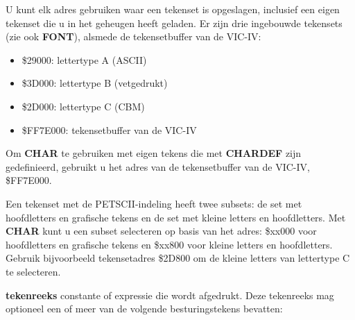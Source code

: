 \begin{description}[leftmargin=2cm,style=nextline]
                 U kunt elk adres gebruiken waar een tekenset is opgeslagen, inclusief een eigen tekenset die u in het geheugen heeft geladen. Er zijn drie ingebouwde tekensets (zie ook {\bf FONT}), alsmede de tekensetbuffer van de VIC-IV:
                 \begin{itemize}
                    \item \$29000: lettertype A (ASCII)                    \item \$3D000: lettertype B (vetgedrukt)                    \item \$2D000: lettertype C (CBM)                    \item \$FF7E000: tekensetbuffer van de VIC-IV
                 \end{itemize}

                 Om {\bf CHAR} te gebruiken met eigen tekens die met {\bf CHARDEF} zijn gedefinieerd, gebruikt u het adres van de tekensetbuffer van de VIC-IV, \$FF7E000.

                 Een tekenset met de PETSCII-indeling heeft twee subsets: de set met hoofdletters en grafische tekens en de set met kleine letters en hoofdletters. Met {\bf CHAR} kunt u een subset selecteren op basis van het adres: \$xx000 voor hoofdletters en grafische tekens en \$xx800 voor kleine letters en hoofdletters. Gebruik bijvoorbeeld tekensetadres \$2D800 om de kleine letters van lettertype C te selecteren.

                 {\bf tekenreeks} constante of expressie die wordt afgedrukt. Deze tekenreeks mag optioneel een of meer van de volgende besturingstekens bevatten:


\end{description}
